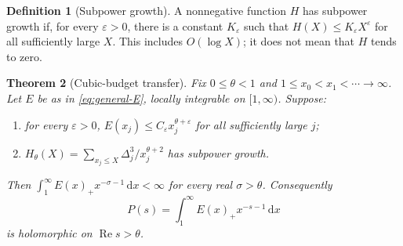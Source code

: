 \documentclass[11pt]{article}
\newtheorem{theorem}{Theorem}[section]
\theoremstyle{definition}
\newtheorem{definition}[theorem]{Definition}
\newcommand{\ep}{\varepsilon}
\newcommand{\Rea}{\operatorname{Re}}
\newcommand{\dd}{\,\mathrm d}
\begin{document}
\begin{definition}[Subpower growth]
A nonnegative function \(H\) has subpower growth if, for every
\(\ep>0\), there is a constant \(K_\ep\) such that
\(H(X)\leq K_\ep X^\ep\) for all sufficiently large \(X\).
This includes \(O(\log X)\); it does not mean that \(H\) tends to zero.
\end{definition}

\begin{theorem}[Cubic-budget transfer]\label{thm:transfer}
Fix \(0\leq\theta<1\) and \(1\leq x_0<x_1<\cdots\to\infty\).
Let \(E\) be as in \eqref{eq:general-E}, locally integrable on
\([1,\infty)\). Suppose:
\begin{enumerate}
\item for every \(\ep>0\),
\(E(x_j)\leq C_\ep x_j^{\theta+\ep}\) for all sufficiently large \(j\);
\item \(H_\theta(X)=\sum_{x_j\leq X}\Delta_j^3/x_j^{\theta+2}\)
has subpower growth.
\end{enumerate}
Then \(\int_1^\infty E(x)_+x^{-\sigma-1}\dd x<\infty\) for every
real \(\sigma>\theta\). Consequently
\begin{equation}\label{eq:positive-transform}
 P(s)=\int_1^\infty E(x)_+x^{-s-1}\dd x
\end{equation}
is holomorphic on \(\Rea s>\theta\).
\end{theorem}
\end{document}
